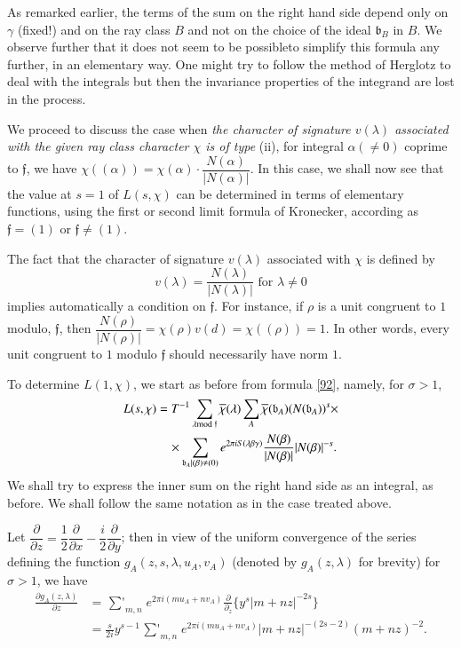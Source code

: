 As remarked earlier, the terms of the sum on the right hand side
depend only on $\gamma$ (fixed!) and on the ray class $B$ and not on
the choice of the ideal $\mathfrak{b}_{B}$ in $B$. We observe further
that it does not seem to be possible\pageoriginale to simplify this
formula any further, in an elementary way. One might try to follow the
method of Herglotz to deal with the integrals but then the invariance
properties of the integrand are lost in the process.

We proceed to discuss the case when {\em the character of signature
  $v(\lambda)$ associated with the given ray class character $\chi$ is
  of type} (ii), \ie for integral $\alpha(\neq 0)$ coprime to
$\mathfrak{f}$, we have $\chi((\alpha))=\chi(\alpha)\cdot
\dfrac{N(\alpha)}{|N(\alpha)|}$. In this case, we shall now see that
the value at $s=1$ of $L(s,\chi)$ can be determined in terms of
elementary functions, using the first or second limit formula of
Kronecker, according as $\mathfrak{f}=(1)$ or $\mathfrak{f}\neq (1)$.

The fact that the character of signature $v(\lambda)$ associated with
$\chi$ is defined by
\begin{equation*}
v(\lambda)=\frac{N(\lambda)}{|N(\lambda)|}\text{ \ for \ } \lambda
\neq 0\tag{104}\label{104}
\end{equation*}
implies automatically a condition on $\mathfrak{f}$. For instance, if
$\rho$ is a unit congruent to $1$ modulo, $\mathfrak{f}$, then
$\dfrac{N(\rho)}{|N(\rho)|}=\chi(\rho)v(d)=\chi((\rho))=1$. In other
words, every unit congruent to $1$ modulo $\mathfrak{f}$ should
necessarily have norm $1$.

To determine $L(1,\chi)$, we start as before from formula \eqref{92},
namely, for $\sigma>1$,
\begin{align*}
L(s,\chi) &=
T^{-1}\sum_{\lambda\rm{mod} \;\mathfrak{f}}\overline{\chi}(\lambda)\sum_{A}\overline{\chi}(\mathfrak{b}_{A})(N(\mathfrak{b}_{A}))^{s}\times\\
&\quad \times \sum_{\mathfrak{b}_{A}|(\beta)\neq (0)}e^{2\pi
  iS(\lambda\beta\gamma)}\frac{N(\beta)}{|N(\beta)|}|N(\beta)|^{-s}. 
\end{align*}
We shall try to express the inner sum on the right hand side as an
integral, as before. We shall follow the same notation as in the case
treated above.

Let $\dfrac{\partial}{\partial
  z}=\dfrac{1}{2}\dfrac{\partial}{\partial
  x}-\dfrac{i}{2}\dfrac{\partial}{\partial y}$; then in view of the
uniform convergence of the series defining the function
$g_{A}(z,s,\lambda,u_{A},v_{A})$ (denoted by $g_{A}(z,\lambda)$ for
brevity) for $\sigma>1$, we have
\begin{align*}
\frac{\partial g_{A}(z,\lambda)}{\partial z} &= \mathop{{\sum}'}_{m,n}e^{2\pi i(mu_{A}+nv_{A})}\frac{\partial}{\partial_{z}}\{y^{s}|m+nz|^{-2s}\}\\
&= \frac{s}{2i}y^{s-1}\mathop{{\sum}'}_{m,n}e^{2\pi i(mu_{A}+nv_{A})}|m+nz|^{-(2s-2)}(m+nz)^{-2}.\tag{105}\label{105} 
\end{align*}\pageoriginale

